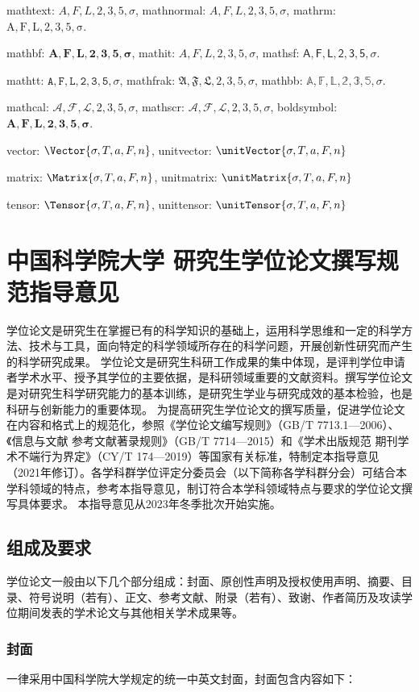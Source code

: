 mathtext: $A,F,L,2,3,5,\sigma$, mathnormal: $A,F,L,2,3,5,\sigma$, mathrm: $\mathrm{A,F,L,2,3,5,\sigma}$.

mathbf: $\mathbf{A,F,L,2,3,5,\sigma}$, mathit: $\mathit{A,F,L,2,3,5,\sigma}$, mathsf: $\mathsf{A,F,L,2,3,5,\sigma}$.

mathtt: $\mathtt{A,F,L,2,3,5,\sigma}$, mathfrak: $\mathfrak{A,F,L,2,3,5,\sigma}$, mathbb: $\mathbb{A,F,L,2,3,5,\sigma}$.

mathcal: $\mathcal{A,F,L,2,3,5,\sigma}$, mathscr: $\mathscr{A,F,L,2,3,5,\sigma}$, boldsymbol: $\boldsymbol{A,F,L,2,3,5,\sigma}$.

vector: $\Vector{\sigma, T, a, F, n}$, unitvector: $\unitVector{\sigma, T, a, F, n}$

matrix: $\Matrix{\sigma, T, a, F, n}$, unitmatrix: $\unitMatrix{\sigma, T, a, F, n}$

tensor: $\Tensor{\sigma, T, a, F, n}$, unittensor: $\unitTensor{\sigma, T, a, F, n}$ 

\section{中国科学院大学
研究生学位论文撰写规范指导意见}

学位论文是研究生在掌握已有的科学知识的基础上，运用科学思维和一定的科学方法、技术与工具，面向特定的科学领域所存在的科学问题，开展创新性研究而产生的科学研究成果。
学位论文是研究生科研工作成果的集中体现，是评判学位申请者学术水平、授予其学位的主要依据，是科研领域重要的文献资料。撰写学位论文是对研究生科学研究能力的基本训练，是研究生学业与研究成效的基本检验，也是科研与创新能力的重要体现。
为提高研究生学位论文的撰写质量，促进学位论文在内容和格式上的规范化，参照《学位论文编写规则》（GB/T 7713.1—2006）、《信息与文献 参考文献著录规则》（GB/T 7714—2015）和《学术出版规范 期刊学术不端行为界定》（CY/T 174—2019）等国家有关标准，特制定本指导意见（2021年修订）。各学科群学位评定分委员会（以下简称各学科群分会）可结合本学科领域的特点，参考本指导意见，制订符合本学科领域特点与要求的学位论文撰写具体要求。
本指导意见从2023年冬季批次开始实施。

\subsection{组成及要求}
学位论文一般由以下几个部分组成：封面、原创性声明及授权使用声明、摘要、目录、符号说明（若有）、正文、参考文献、附录（若有）、致谢、作者简历及攻读学位期间发表的学术论文与其他相关学术成果等。
\subsubsection{封面}
一律采用中国科学院大学规定的统一中英文封面，封面包含内容如下：

